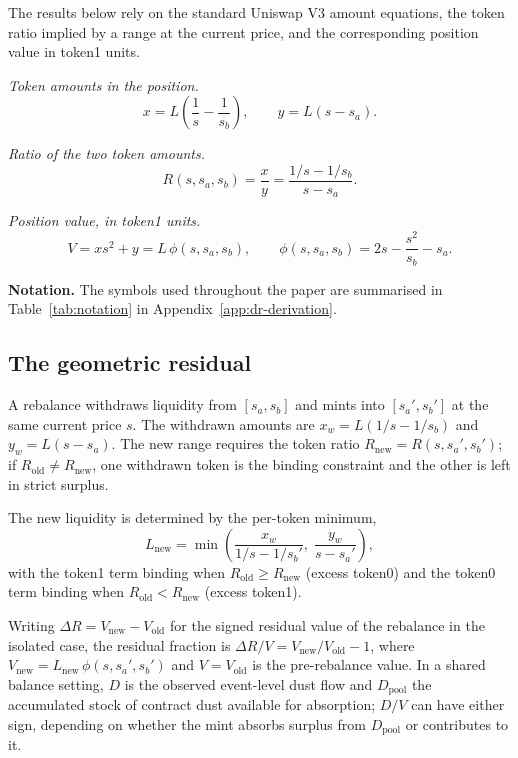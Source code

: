 \documentclass[11pt,a4paper]{article}
\theoremstyle{plain}
\begin{document}
The results below rely on the standard Uniswap V3 amount equations, the token ratio implied by a range at the current price, and the corresponding position value in token1 units.

\medskip
\noindent\emph{Token amounts in the position.}
\begin{equation}\label{eq:amounts}
x = L \left(\frac{1}{s} - \frac{1}{s_b}\right),
\qquad
y = L (s - s_a).
\end{equation}

\noindent\emph{Ratio of the two token amounts.}
\begin{equation}\label{eq:ratio}
R(s, s_a, s_b) = \frac{x}{y} = \frac{1/s - 1/s_b}{s - s_a}.
\end{equation}

\noindent\emph{Position value, in token1 units.}
\begin{equation}\label{eq:value}
V = x s^2 + y = L\,\phi(s, s_a, s_b),
\qquad
\phi(s, s_a, s_b) = 2s - \frac{s^2}{s_b} - s_a.
\end{equation}

\textbf{Notation.} The symbols used throughout the paper are summarised in Table~\ref{tab:notation} in Appendix~\ref{app:dr-derivation}.

\subsection{The geometric residual}\label{sec:residual}

A rebalance withdraws liquidity from $[s_a, s_b]$ and mints into $[s_a', s_b']$ at the same current price $s$. The withdrawn amounts are $x_w = L(1/s - 1/s_b)$ and $y_w = L(s - s_a)$. The new range requires the token ratio $R_{\text{new}} = R(s, s_a', s_b')$; if $R_{\text{old}} \neq R_{\text{new}}$, one withdrawn token is the binding constraint and the other is left in strict surplus.

The new liquidity is determined by the per-token minimum,
\begin{equation}\label{eq:lnew-min}
L_{\text{new}} = \min\!\left(\frac{x_w}{1/s - 1/s_b'}, \; \frac{y_w}{s - s_a'}\right),
\end{equation}
with the token1 term binding when $R_{\text{old}} \geq R_{\text{new}}$ (excess token0) and the token0 term binding when $R_{\text{old}} < R_{\text{new}}$ (excess token1).

Writing $\Delta R = V_{\text{new}} - V_{\text{old}}$ for the signed residual value of the rebalance in the isolated case, the residual fraction is $\Delta R/V = V_{\text{new}}/V_{\text{old}} - 1$, where $V_{\text{new}} = L_{\text{new}}\,\phi(s, s_a', s_b')$ and $V = V_{\text{old}}$ is the pre-rebalance value. In a shared balance setting, $D$ is the observed event-level dust flow and $D_{\text{pool}}$ the accumulated stock of contract dust available for absorption; $D/V$ can have either sign, depending on whether the mint absorbs surplus from $D_{\text{pool}}$ or contributes to it.
\end{document}
